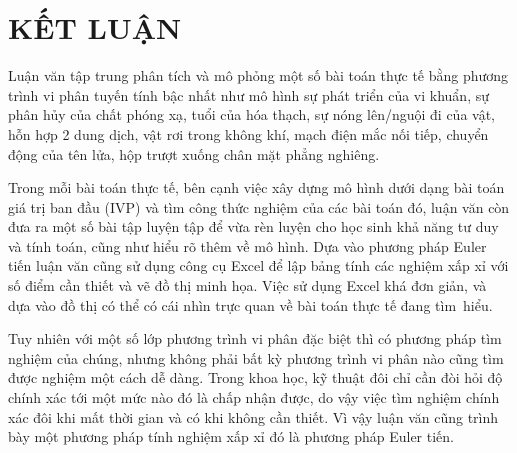 \section*{KẾT LUẬN}
Luận văn tập trung phân tích và mô phỏng một số bài toán thực tế bằng phương trình vi phân tuyến tính bậc nhất như mô hình sự phát triển của vi khuẩn, sự phân hủy của chất phóng xạ, tuổi của hóa thạch, sự nóng lên/nguội đi của vật, hỗn hợp 2 dung dịch, vật rơi trong không khí, mạch điện mắc nối tiếp, chuyển động của tên lửa, hộp trượt xuống chân mặt phẳng nghiêng. 

Trong mỗi bài toán thực tế, bên cạnh việc xây dựng mô hình dưới dạng bài toán giá trị ban đầu (IVP) và tìm công thức nghiệm của các bài toán đó, luận văn còn đưa ra một số bài tập luyện tập để vừa rèn luyện cho học sinh khả năng tư duy và tính toán, cũng như hiểu rõ thêm về mô hình. Dựa vào phương pháp Euler tiến luận văn cũng sử dụng công cụ Excel để lập bảng tính các nghiệm xấp xỉ với số điểm cần thiết và vẽ đồ thị minh họa. Việc sử dụng Excel khá đơn giản, và dựa vào đồ thị có thể có cái nhìn trực quan về bài toán thực tế đang tìm~hiểu.

Tuy nhiên với một số lớp phương trình vi phân đặc biệt thì có phương pháp tìm nghiệm của chúng, nhưng không phải bất kỳ phương trình vi phân nào cũng tìm được nghiệm một cách dễ dàng. Trong khoa học, kỹ thuật đôi chỉ cần đòi hỏi độ chính xác tới một mức nào đó là chấp nhận được, do vậy việc tìm nghiệm chính xác đôi khi mất thời gian và có khi không cần thiết. Vì vậy luận văn cũng trình bày một phương pháp tính nghiệm xấp xỉ đó là phương pháp Euler tiến.